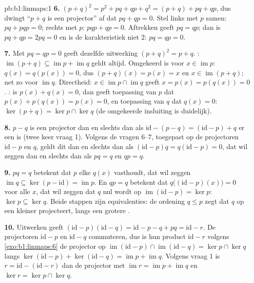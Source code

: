 \begin{solution}{pb:b1:linmaps:1}
\textbf{6.} $(p + q)^2 = p^2 + pq + qp + q^2 = (p + q) + pq + qp$,
dus dwingt ``$p + q$ is een projector'' af dat $pq + qp = 0$. Stel
links met $p$ samen: $pq + pqp = 0$; rechts met $p$: $pqp + qp =
0$. Aftrekken geeft $pq = qp$; dan is $pq + qp = 2pq = 0$ en is de
karakteristiek niet $2$: $pq = qp = 0$.

\textbf{7.} Met $pq = qp = 0$ geeft dezelfde uitwerking $(p + q)^2
= p + q$. : $\operatorname{im}(p + q) \subseteq
\operatorname{im} p + \operatorname{im} q$ geldt altijd. Omgekeerd
is voor $x \in \operatorname{im} p$: $q(x) = q(p(x)) = 0$, dus $(p
+ q)(x) = p(x) = x$ en $x \in \operatorname{im}(p+q)$; net zo voor
$\operatorname{im} q$. Directheid: $x \in \operatorname{im} p \cap
\operatorname{im} q$ geeft $x = p(x) = p(q(x)) = 0$. : is $p(x)
+ q(x) = 0$, dan geeft toepassing van $p$ dat $p(x) + p(q(x)) =
p(x) = 0$, en toepassing van $q$ dat $q(x) = 0$: $\ker(p + q) =
\ker p \cap \ker q$ (de omgekeerde insluiting is duidelijk).

\textbf{8.} $p - q$ is een projector dan en slechts dan als
$\mathrm{id} - (p - q) = (\mathrm{id} - p) + q$ er een is (twee
keer vraag 1). Volgens de vragen 6--7, toegepast op de projectoren
$\mathrm{id} - p$ en $q$, geldt dit dan en slechts dan als
$(\mathrm{id} - p)q = q(\mathrm{id} - p) = 0$, dat wil zeggen dan
en slechts dan als $pq = q$ en $qp = q$.

\textbf{9.} $pq = q$ betekent dat $p$ elke $q(x)$ vasthoudt, dat
wil zeggen $\operatorname{im} q \subseteq \ker(p - \mathrm{id}) =
\operatorname{im} p$. En $qp = q$ betekent dat
$q\bigl((\mathrm{id} - p)(x)\bigr) = 0$ voor alle $x$, dat wil
zeggen dat $q$ nul wordt op $\operatorname{im}(\mathrm{id} - p) =
\ker p$: $\ker p \subseteq \ker q$. Beide stappen zijn
equivalenties: de ordening $q \leq p$ zegt dat $q$ op een kleiner
 projecteert, langs een grotere .

\textbf{10.} Uitwerken geeft $(\mathrm{id} - p)(\mathrm{id} - q) =
\mathrm{id} - p - q + pq = \mathrm{id} - r$. De projectoren
$\mathrm{id} - p$ en $\mathrm{id} - q$ commuteren, dus is hun
product $\mathrm{id} - r$ volgens \cref{exo:b1:linmaps:6} de
projector op $\operatorname{im}(\mathrm{id} - p) \cap
\operatorname{im}(\mathrm{id} - q) = \ker p \cap \ker q$ langs
$\ker(\mathrm{id} - p) + \ker(\mathrm{id} - q) = \operatorname{im}
p + \operatorname{im} q$. Volgens vraag 1 is $r = \mathrm{id} -
(\mathrm{id} - r)$ dan de projector met $\operatorname{im} r =
\operatorname{im} p + \operatorname{im} q$ en $\ker r = \ker p \cap
\ker q$.


\end{solution}
